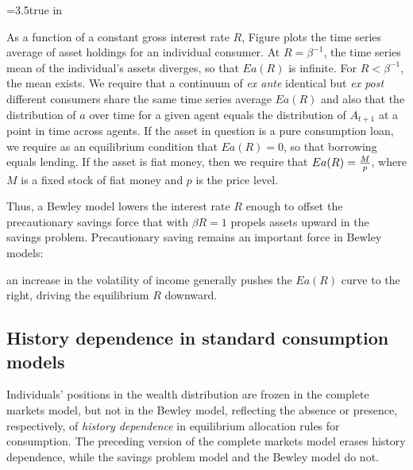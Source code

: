 \centerline{\epsfxsize=3.5true in}
\caption{Mean of time series average of household consumption
as function of risk-free gross interest rate $R$.}
\endfigure

As a function of a constant gross interest rate $R$,
Figure 
plots the time series average of asset holdings for an
individual consumer.  At $R=\beta^{-1}$, the time series mean
of the individual's assets diverges, so that $E a(R)$ is infinite.
 For $R < \beta^{-1}$, the mean exists.  We require that a continuum
of {\it ex ante\/} identical but {\it ex post\/}
 different consumers share the same
time series average $E a(R)$ and also that the distribution of
$a$ over time for a given agent equals the distribution of $A_{t+1}$ at a point in time across
agents.  If the
asset in question is a pure consumption loan, we require
as an equilibrium condition that $E a(R) =0$, so that
borrowing equals lending. If the asset is fiat money, then
we require that $E a(R) = {M \over p}$, where $M$ is a fixed stock of fiat
money and $p$ is the price level.

Thus, a Bewley model lowers the interest rate $R$
enough to offset the precautionary savings force that with $\beta R=1$ propels
assets upward
in the savings problem.
  Precautionary saving remains an important force in Bewley
models:

\newpage \noindent
 an increase in the volatility of income generally pushes
the $E a(R)$ curve to the right, driving the equilibrium $R$ downward.





\subsection{History dependence in standard consumption models}

Individuals' positions in the wealth distribution
are frozen in  the complete markets model,    but not
in the Bewley model, reflecting the absence or presence, respectively,
 of {\it history dependence\/} in
 equilibrium allocation rules for consumption.
   The preceding version of the complete markets model
erases history dependence, while the savings problem model and the
Bewley model do not.


